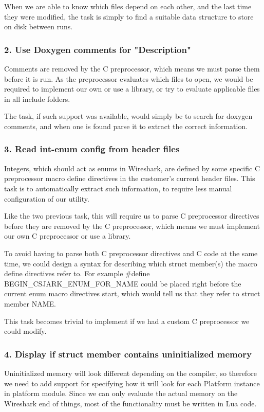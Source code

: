 When we are able to know which files depend on each other, and the last time they were modified, the task is simply to find a suitable data structure to store on disk between runs.

\subsubsection{2. Use Doxygen comments for "Description"}
Comments are removed by the C preprocessor, which means we must parse them before it is run. As the preprocessor evaluates which files to open, we would be required to implement our own or use a library, or try to evaluate applicable files in all include folders.

The task, if such support was available, would simply be to search for doxygen comments, and when one is found parse it to extract the correct information.

\subsubsection{3. Read int-enum config from header files}
Integers, which should act as enums in Wireshark, are defined by some specific C preprocessor macro define directives in the customer's current header files. This task is to automatically extract such information, to require less manual configuration of our utility.

Like the two previous task, this will require us to parse C preprocessor directives before they are removed by the C preprocessor, which means we must implement our own C preprocessor or use a library.

To avoid having to parse both C preprocessor directives and C code at the same time, we could design a syntax for describing which struct member(s) the macro define directives refer to. For example \#define BEGIN\_CSJARK\_ENUM\_FOR\_NAME could be placed right before the current enum macro directives start, which would tell us that they refer to struct member NAME.

This task becomes trivial to implement if we had a custom C preprocessor we could modify.

\subsubsection{4. Display if struct member contains uninitialized memory}
Uninitialized memory will look different depending on the compiler, so therefore we need to add support for specifying how it will look for each Platform instance in platform module. Since we can only evaluate the actual memory on the Wireshark end of things, most of the functionality must be written in Lua code.

